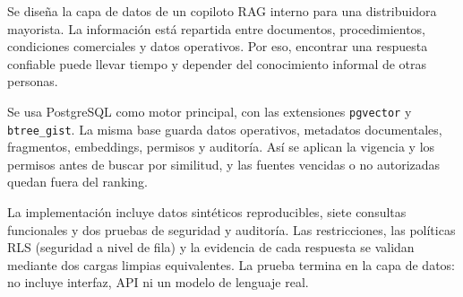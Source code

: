 Se diseña la capa de datos de un copiloto RAG interno para una distribuidora
mayorista. La información está repartida entre documentos, procedimientos,
condiciones comerciales y datos operativos. Por eso, encontrar una respuesta
confiable puede llevar tiempo y depender del conocimiento informal de otras
personas.

Se usa PostgreSQL como motor principal, con las extensiones
\texttt{pgvector} y \texttt{btree\_gist}. La misma base guarda datos
operativos, metadatos documentales, fragmentos, embeddings, permisos y
auditoría. Así se aplican la vigencia y los permisos antes de buscar por
similitud, y las fuentes vencidas o no autorizadas quedan fuera del ranking.

La implementación incluye datos sintéticos reproducibles, siete consultas
funcionales y dos pruebas de seguridad y auditoría. Las restricciones, las
políticas RLS (seguridad a nivel de fila) y la evidencia de cada respuesta se
validan mediante dos cargas limpias equivalentes. La prueba termina en la capa
de datos: no incluye interfaz, API ni un modelo de lenguaje real.

